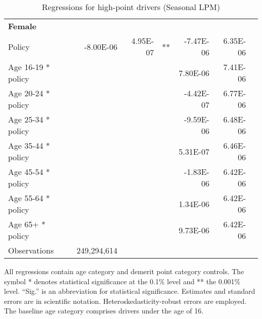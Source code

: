 \begin{table}
\begin{tabular}{l r r l r r l}
\hline 

\textbf{Female} \\ 

Policy             &  -8.00E-06        &  4.95E-07       &   **       &  -7.47E-06        &  6.35E-06       &            \\ 
Age 16-19 * policy           & & &  &  7.80E-06        &  7.41E-06       &            \\ 
Age 20-24 * policy           & & &  &  -4.42E-07        &  6.77E-06       &            \\ 
Age 25-34 * policy           & & &  &  -9.59E-06        &  6.48E-06       &            \\ 
Age 35-44 * policy           & & &  &  5.31E-07        &  6.46E-06       &            \\ 
Age 45-54 * policy           & & &  &  -1.83E-06        &  6.42E-06       &            \\ 
Age 55-64 * policy           & & &  &  1.34E-06        &  6.42E-06       &            \\ 
Age 65+ * policy           & & &  &  9.73E-06        &  6.42E-06       &            \\ 
Observations & 249,294,614 \\ 


\hline 

\end{tabular} 
\caption{Regressions for high-point drivers (Seasonal LPM)} 
All regressions contain age category and demerit point category controls. 
The symbol * denotes statistical significance at the 0.1\% level 
and ** the 0.001\% level. 
``Sig.'' is an abbreviation for statistical significance. 
Estimates and standard errors are in scientific notation. 
Heteroskedasticity-robust errors are employed. 
The baseline age category comprises drivers under the age of 16. 
\label{tab:seas_high_pt_regs} 
\end{table} 
 
